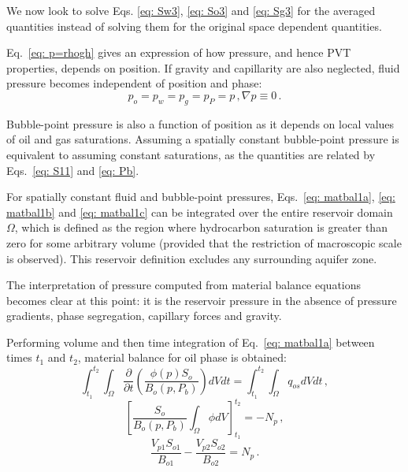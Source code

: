 \documentclass[authoryear,preprint,review,12pt]{elsarticle}
\begin{document}
We now look to solve Eqs. \eqref{eq: Sw3}, \eqref{eq: So3} and \eqref{eq: Sg3} for the averaged quantities instead of solving them for the original space dependent quantities. 

Eq.~\eqref{eq: p=rhogh} gives an expression of how pressure, and hence PVT properties, depends on position. If gravity and capillarity are also neglected, fluid pressure becomes independent of position and phase:
\begin{subequations}\label{eq: fullsimp}
\begin{equation}
p_o=p_w=p_g=p_P=p \, ,
\end{equation}
\begin{equation}
\nabla p \equiv 0 \, .
\end{equation}
\end{subequations}

Bubble-point pressure is also a function of position as it depends on local values of oil and gas saturations. Assuming a spatially constant bubble-point pressure is equivalent to assuming constant saturations, as the quantities are related by Eqs.~\eqref{eq: S11} and \eqref{eq: Pb}.


For spatially constant fluid and bubble-point pressures, Eqs.~\eqref{eq: matbal1a}, \eqref{eq: matbal1b} and \eqref{eq: matbal1c} can be integrated over the entire reservoir domain $\Omega$, which is defined as the region where hydrocarbon saturation is greater than zero for some arbitrary volume (provided that the restriction of macroscopic scale is observed). This reservoir definition excludes any surrounding aquifer zone.

The interpretation of pressure computed from material balance equations becomes clear at this point: it is the reservoir pressure in the absence of pressure gradients, phase segregation, capillary forces and gravity.

Performing volume and then time integration of Eq.~\eqref{eq: matbal1a} between times $t_1$ and $t_2$, material balance for oil phase is obtained:
\begin{equation}
\int_{t_1}^{t_2}\int_{\Omega} \frac{\partial}{\partial t}\left(\frac{\phi(p) S_o}{B_o(p,P_b)}\right) dV dt = \int_{t_1}^{t_2}\int_{\Omega} q_{os} dV dt\, ,
\end{equation}
\begin{equation}
\left[ \frac{S_o}{B_o(p,P_b)} \int_{\Omega}\phi dV \right]^{t_2}_{t_1} = -N_p \, ,
\end{equation}
\begin{equation}\label{eq: So5}
\frac{V_{p1} S_{o1}}{B_{o1}}-\frac{V_{p2}S_{o2}}{B_{o2}} = N_p \, .
\end{equation}
\end{document}

